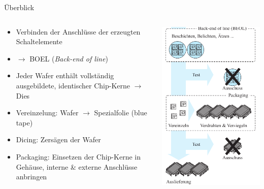 \documentclass[12pt%
,aspectratio=169%
]{beamer}
\begin{document}
\begin{frame}{Überblick}
\begin{columns}[T] %
\begin{column}{.58\textwidth}
\begin{itemize}
	\item Verbinden der Anschlüsse der erzeugten Schaltelemente
	\item $\to$ BOEL (\emph{Back-end of line})
	\item Jeder Wafer enthält vollständig ausgebildete, identischer Chip-Kerne $\to$ Dies
	\item Vereinzelung: Wafer $\to$ Spezialfolie (blue tape)
	\item Dicing: Zersägen der Wafer
	\item Packaging: Einsetzen der Chip-Kerne in Gehäuse, interne \& externe Anschlüsse anbringen
\end{itemize}
\end{column}%
\hfill%
\begin{column}{.38\textwidth}
\centering
\vspace*{-1cm}
\includegraphics[scale=0.4]{pictures/ic2}
\end{column}%
\end{columns}
\end{frame}
\end{document}
